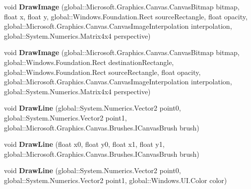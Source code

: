 \begin{DoxyCompactItemize}
void {\bfseries Draw\+Image} (global\+::\+Microsoft.\+Graphics.\+Canvas.\+Canvas\+Bitmap bitmap, float x, float y, global\+::\+Windows.\+Foundation.\+Rect source\+Rectangle, float opacity, global\+::\+Microsoft.\+Graphics.\+Canvas.\+Canvas\+Image\+Interpolation interpolation, global\+::\+System.\+Numerics.\+Matrix4x4 perspective)
\item 
\mbox{\label{class_microsoft_1_1_graphics_1_1_canvas_1_1_canvas_drawing_session_ab8594b24d98e2dfceb278d1989474281}} 
void {\bfseries Draw\+Image} (global\+::\+Microsoft.\+Graphics.\+Canvas.\+Canvas\+Bitmap bitmap, global\+::\+Windows.\+Foundation.\+Rect destination\+Rectangle, global\+::\+Windows.\+Foundation.\+Rect source\+Rectangle, float opacity, global\+::\+Microsoft.\+Graphics.\+Canvas.\+Canvas\+Image\+Interpolation interpolation, global\+::\+System.\+Numerics.\+Matrix4x4 perspective)
\item 
\mbox{\label{class_microsoft_1_1_graphics_1_1_canvas_1_1_canvas_drawing_session_a2998043fd70a6a9d46333a4729b1f6e3}} 
void {\bfseries Draw\+Line} (global\+::\+System.\+Numerics.\+Vector2 point0, global\+::\+System.\+Numerics.\+Vector2 point1, global\+::\+Microsoft.\+Graphics.\+Canvas.\+Brushes.\+I\+Canvas\+Brush brush)
\item 
\mbox{\label{class_microsoft_1_1_graphics_1_1_canvas_1_1_canvas_drawing_session_a7dd9cbef51eb671c3cb8ccd51282c333}} 
void {\bfseries Draw\+Line} (float x0, float y0, float x1, float y1, global\+::\+Microsoft.\+Graphics.\+Canvas.\+Brushes.\+I\+Canvas\+Brush brush)
\item 
\mbox{\label{class_microsoft_1_1_graphics_1_1_canvas_1_1_canvas_drawing_session_aadc6010b8c40aa683e392af2302acbd6}} 
void {\bfseries Draw\+Line} (global\+::\+System.\+Numerics.\+Vector2 point0, global\+::\+System.\+Numerics.\+Vector2 point1, global\+::\+Windows.\+U\+I.\+Color color)
\item 
\mbox{\label{class_microsoft_1_1_graphics_1_1_canvas_1_1_canvas_drawing_session_a572c7f875ce2e34539e4f62a1ae5b468}} 

\end{DoxyCompactItemize}
